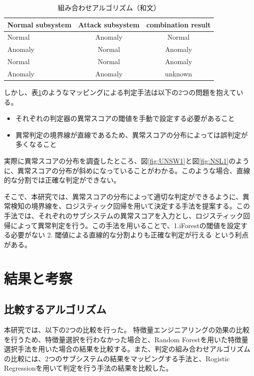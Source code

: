 \documentclass{css}
\begin{document}
\begin{table}[tb]
    \caption{組み合わせアルゴリズム（和文）}
    \centering
    \footnotesize
    \begin{tabular}{lcc}
        \hline
        Normal subsystem & Attack subsystem & combination result\\
        \hline
        Normal & Anomaly & Normal \\
        Anomaly & Normal & Anomaly \\
        Normal & Normal & Anomaly \\
        Anomaly & Anomaly & unknown \\
        \hline
    \end{tabular}
    \label{tab:combination}
\end{table}

しかし、表\ref{tab:combination}のようなマッピングによる判定手法は以下の2つの問題を抱えている。
\begin{itemize}
    \item それぞれの判定器の異常スコアの閾値を手動で設定する必要があること
    \item 異常判定の境界線が直線であるため、異常スコアの分布によっては誤判定が多くなること
\end{itemize}
実際に異常スコアの分布を調査したところ、図\ref{fig:UNSW1}と図\ref{fig:NSL1}のように、異常スコアの分布が斜めになっていることがわかる。このような場合、直線的な分割では正確な判定ができない。

そこで、本研究では、異常スコアの分布によって適切な判定ができるように、異常検知の境界線を、ロジスティック回帰を用いて決定する手法を提案する。この手法では、それぞれのサブシステムの異常スコアを入力とし、ロジスティック回帰によって異常判定を行う。この手法を用いることで、1.iForestの閾値を設定する必要がない 2. 閾値による直線的な分割よりも正確な判定が行える という利点がある。

\section{結果と考察}

\subsection{比較するアルゴリズム}

本研究では、以下の2つの比較を行った。
特徴量エンジニアリングの効果の比較を行うため、特徴量選択を行わなかった場合と、Random Forestを用いた特徴量選択手法を用いた場合の結果を比較する。また、判定の組み合わせアルゴリズムの比較には、2つのサブシステムの結果をマッピングする手法と、Rogistic Regressionを用いて判定を行う手法の結果を比較した。
\end{document}
